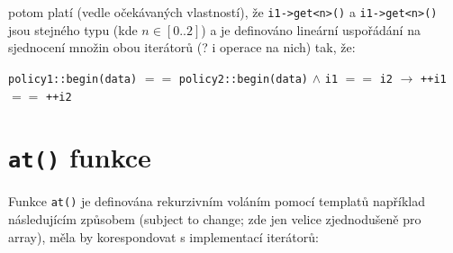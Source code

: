 \documentclass[a4paper,12pt]{article} %
\begin{document}
    potom platí (vedle očekávaných vlastností), že \lstinline{i1->get<n>()} a \lstinline{i1->get<n>()} jsou stejného typu (kde $n \in [0..2]$) a je definováno lineární uspořádání na sjednocení množin obou iterátorů (? i operace na nich) tak, že:

    \begin{center}
        \lstinline{policy1::begin(data)} $==$ \lstinline{policy2::begin(data)} $\wedge$
    \lstinline{i1} $==$ \lstinline{i2} $\to$ \lstinline{++i1} $==$ \lstinline{++i2}
    \end{center}

    \section{\lstinline{at()} funkce}

    Funkce \lstinline{at()} je definována rekurzivním voláním pomocí templatů například následujícím způsobem (subject to change; zde jen velice zjednodušeně pro array), měla by korespondovat s implementací iterátorů:
    
\end{document}
